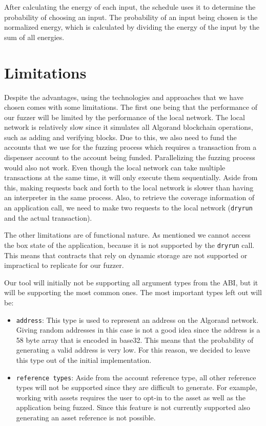 After calculating the energy of each input, the schedule uses it to determine the probability of choosing an input.
The probability of an input being chosen is the normalized energy, which is calculated by dividing the energy of the input by the sum of all energies.


\section{Limitations}
Despite the advantages, using the technologies and approaches that we have chosen comes with some limitations.
The first one being that the performance of our fuzzer will be limited by the performance of the local network.
The local network is relatively slow since it simulates all Algorand blockchain operations, such as adding and verifying blocks.
Due to this, we also need to fund the accounts that we use for the fuzzing process which requires a transaction from a dispenser account to the account being funded.
Parallelizing the fuzzing process would also not work.
Even though the local network can take multiple transactions at the same time, it will only execute them sequentially.
Aside from this, making requests back and forth to the local network is slower than having an interpreter in the same process.
Also, to retrieve the coverage information of an application call, we need to make two requests to the local network (\texttt{dryrun} and the actual transaction).

The other limitations are of functional nature.
As mentioned we cannot access the box state of the application, because it is not supported by the \texttt{dryrun} call.
This means that contracts that rely on dynamic storage are not supported or impractical to replicate for our fuzzer.

Our tool will initially not be supporting all argument types from the \ac{ABI}, but it will be supporting the most common ones.
The most important types left out will be:
\begin{itemize}
    \item \texttt{address}: This type is used to represent an address on the Algorand network.
          Giving random addresses in this case is not a good idea since the address is a 58 byte array that is encoded in base32.
          This means that the probability of generating a valid address is very low. For this reason, we decided to leave this type out of the initial implementation.
    \item \texttt{reference types}: Aside from the account reference type, all other reference types will not be supported since they are difficult to generate.
          For example, working with assets requires the user to opt-in to the asset as well as the application being fuzzed.
          Since this feature is not currently supported also generating an asset reference is not possible.
\end{itemize}

